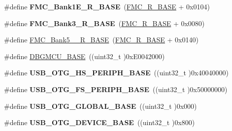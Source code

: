 \begin{DoxyCompactItemize}
\item 
\#define {\bfseries F\+M\+C\+\_\+\+Bank1\+E\+\_\+\+R\+\_\+\+B\+A\+SE}~(\hyperlink{group___peripheral__memory__map_ga7a599164cd92798542bc6288793d1ed5}{F\+M\+C\+\_\+\+R\+\_\+\+B\+A\+SE} + 0x0104)\hypertarget{group___peripheral__memory__map_gad82d3a6bac014fa645fb67a63fae4bc0}{}\label{group___peripheral__memory__map_gad82d3a6bac014fa645fb67a63fae4bc0}

\item 
\#define {\bfseries F\+M\+C\+\_\+\+Bank3\+\_\+\+R\+\_\+\+B\+A\+SE}~(\hyperlink{group___peripheral__memory__map_ga7a599164cd92798542bc6288793d1ed5}{F\+M\+C\+\_\+\+R\+\_\+\+B\+A\+SE} + 0x0080)\hypertarget{group___peripheral__memory__map_gaf570671195a13f4bb2a1b8f2bd5305c9}{}\label{group___peripheral__memory__map_gaf570671195a13f4bb2a1b8f2bd5305c9}

\item 
\#define \hyperlink{group___peripheral__memory__map_gace117149a4fc0d07c38cc997fe4c4a73}{F\+M\+C\+\_\+\+Bank5\+\_\+\_\+\+R\+\_\+\+B\+A\+SE}~(\hyperlink{group___peripheral__memory__map_ga7a599164cd92798542bc6288793d1ed5}{F\+M\+C\+\_\+\+R\+\_\+\+B\+A\+SE} + 0x0140)
\item 
\#define \hyperlink{group___peripheral__memory__map_ga4adaf4fd82ccc3a538f1f27a70cdbbef}{D\+B\+G\+M\+C\+U\+\_\+\+B\+A\+SE}~((uint32\+\_\+t )0x\+E0042000)
\item 
\#define {\bfseries U\+S\+B\+\_\+\+O\+T\+G\+\_\+\+H\+S\+\_\+\+P\+E\+R\+I\+P\+H\+\_\+\+B\+A\+SE}~((uint32\+\_\+t )0x40040000)\hypertarget{group___peripheral__memory__map_gaa405d2ebfd7e9394237b6639f16a5409}{}\label{group___peripheral__memory__map_gaa405d2ebfd7e9394237b6639f16a5409}

\item 
\#define {\bfseries U\+S\+B\+\_\+\+O\+T\+G\+\_\+\+F\+S\+\_\+\+P\+E\+R\+I\+P\+H\+\_\+\+B\+A\+SE}~((uint32\+\_\+t )0x50000000)\hypertarget{group___peripheral__memory__map_gaa86d4c80849a74938924e73937b904e7}{}\label{group___peripheral__memory__map_gaa86d4c80849a74938924e73937b904e7}

\item 
\#define {\bfseries U\+S\+B\+\_\+\+O\+T\+G\+\_\+\+G\+L\+O\+B\+A\+L\+\_\+\+B\+A\+SE}~((uint32\+\_\+t )0x000)\hypertarget{group___peripheral__memory__map_ga044aa4388e72d9d47a03f387fb8926fb}{}\label{group___peripheral__memory__map_ga044aa4388e72d9d47a03f387fb8926fb}

\item 
\#define {\bfseries U\+S\+B\+\_\+\+O\+T\+G\+\_\+\+D\+E\+V\+I\+C\+E\+\_\+\+B\+A\+SE}~((uint32\+\_\+t )0x800)\hypertarget{group___peripheral__memory__map_ga4d74a337597a77b1fca978202b519a18}{}\label{group___peripheral__memory__map_ga4d74a337597a77b1fca978202b519a18}


\end{DoxyCompactItemize}
